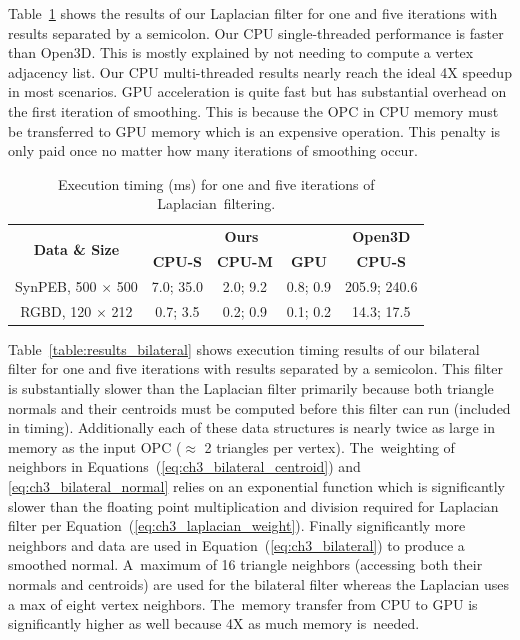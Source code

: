 Table~\ref{table:results_lapalcian} shows the results of our Laplacian filter for one and five iterations with results separated by a semicolon. Our CPU single-threaded performance is faster than Open3D. This is mostly explained by not needing to compute a vertex adjacency list. Our CPU multi-threaded results nearly reach the ideal 4X speedup in most scenarios. GPU acceleration is quite fast but has substantial overhead on the first iteration of smoothing. This is because the OPC in CPU memory must be transferred to GPU memory which is an expensive operation. This penalty is only paid once no matter how many iterations of smoothing occur.  
\begin{table}[H]
\centering
\caption{Execution timing (ms) for one and five iterations of Laplacian~filtering.}\label{table:results_lapalcian}

\begin{tabular}{@{}ccccc@{}}
\toprule
   \multirow{2}{*}{\bf Data \& Size}           & \multicolumn{3}{c}{\textbf{Ours}} & \textbf{Open3D} \\
                  \cmidrule(lr){2-5}     
    & \textbf{CPU-S}     & \textbf{CPU-M}     & \textbf{GPU}         & \textbf{CPU-S}  \\ \midrule
SynPEB, 500 $\times$ 500 & 7.0; 35.0  & 2.0; 9.2   & 0.8; 0.9    & 205.9; 240.6  \\
RGBD, 120 $\times$ 212   & 0.7; 3.5  & 0.2; 0.9   & 0.1; 0.2    & 14.3; 17.5   \\ \bottomrule
\end{tabular}
\end{table}


Table~\ref{table:results_bilateral} shows execution timing results of our bilateral filter for one and five iterations with results separated by a semicolon. This filter is substantially slower than the Laplacian filter primarily because both triangle normals and their centroids must be computed before this filter can run (included in timing). Additionally each of these data structures is nearly twice as large in memory as the input OPC ($\approx$ 2 triangles per vertex). The~weighting of neighbors in Equations~(\ref{eq:ch3_bilateral_centroid}) and \ref{eq:ch3_bilateral_normal} relies on an exponential function which is significantly slower than the floating point multiplication and division required for Laplacian filter per Equation~(\ref{eq:ch3_laplacian_weight}). Finally significantly more neighbors and data are used in Equation~(\ref{eq:ch3_bilateral}) to produce a smoothed normal. A~maximum of 16 triangle neighbors (accessing both their normals and centroids) are used for the bilateral filter whereas the Laplacian uses a max of eight vertex neighbors. The~memory transfer from CPU to GPU is significantly higher as well because 4X as much memory is~needed.

